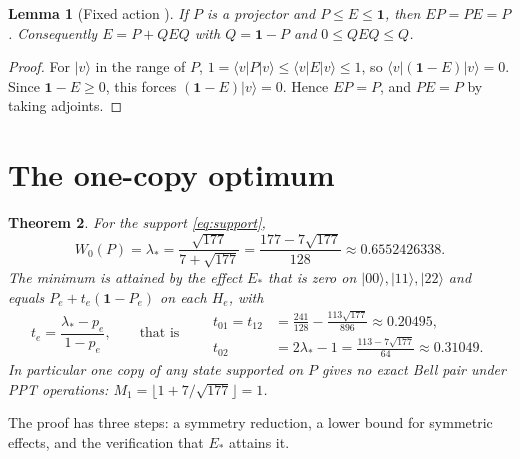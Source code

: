 \documentclass[11pt,a4paper]{article}
\newtheorem{theorem}{Theorem}
\newtheorem{lemma}[theorem]{Lemma}
\theoremstyle{definition}
\theoremstyle{plain}
\newcommand{\ket}[1]{\lvert#1\rangle}
\newcommand{\bra}[1]{\langle#1\rvert}
\newcommand{\one}{\mathbf{1}}
\begin{document}
\begin{lemma}[Fixed action {\cite[Lemma~2.1]{ZhuWang2026}}]\label{lem:fixed}
If $P$ is a projector and $P\le E\le\one$, then $EP=PE=P$. Consequently
$E=P+QEQ$ with $Q=\one-P$ and $0\le QEQ\le Q$.
\end{lemma}
\begin{proof}
For $\ket v$ in the range of $P$, $1=\bra vP\ket v\le\bra vE\ket v\le1$, so
$\bra v(\one-E)\ket v=0$. Since $\one-E\ge0$, this forces $(\one-E)\ket v=0$.
Hence $EP=P$, and $PE=P$ by taking adjoints.
\end{proof}

\section{The one-copy optimum}\label{sec:main}
\begin{theorem}\label{thm:main}
For the support \eqref{eq:support},
\[
W_0(P)=\lambda_*=\frac{\sqrt{177}}{7+\sqrt{177}}=\frac{177-7\sqrt{177}}{128}
\approx0.6552426338.
\]
The minimum is attained by the effect $E_*$ that is zero on
$\ket{00},\ket{11},\ket{22}$ and equals $P_e+t_e(\one-P_e)$ on each $H_e$,
with
\[
t_e=\frac{\lambda_*-p_e}{1-p_e},\qquad\text{that is}\qquad
\begin{aligned}
t_{01}=t_{12}&=\frac{241}{128}-\frac{113\sqrt{177}}{896}\approx0.20495,\\
t_{02}&=2\lambda_*-1=\frac{113-7\sqrt{177}}{64}\approx0.31049 .
\end{aligned}
\]
In particular one copy of any state supported on $P$ gives no exact Bell pair
under PPT operations: $M_1=\lfloor1+7/\sqrt{177}\rfloor=1$.
\end{theorem}

The proof has three steps: a symmetry reduction, a lower bound for symmetric
effects, and the verification that $E_*$ attains it.
\end{document}
